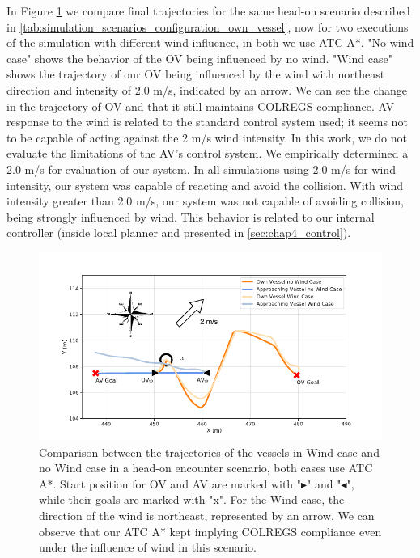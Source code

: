         In Figure \ref{fig:plot_ho_w_vs_wind} we compare final trajectories for the same head-on scenario described in \ref{tab:simulation_scenarios_configuration_own_vessel}, now for two executions of the simulation with different wind influence, in both we use \ac{ATC} A*. "No wind case" shows the behavior of the \ac{OV} being influenced by no wind. "Wind case" shows the trajectory of our \ac{OV} being influenced by the wind with northeast direction and intensity of 2.0 m/s, indicated by an arrow. We can see the change in the trajectory of \ac{OV} and that it still maintains \ac{COLREGS}-compliance. \ac{AV} response to the wind is related to the standard control system used; it seems not to be capable of acting against the 2 m/s wind intensity. In this work, we do not evaluate the limitations of the \ac{AV}'s control system. We empirically determined a 2.0 m/s for evaluation of our system. In all simulations using 2.0 m/s for wind intensity, our system was capable of reacting and avoid the collision. With wind intensity greater than 2.0 m/s, our system was not capable of avoiding collision, being strongly influenced by wind. This behavior is related to our internal controller (inside local planner and presented in \ref{sec:chap4_control}). 
        
        \begin{figure}[H]
            \centering
            \includegraphics[width=\textwidth]{figs/Chap5/plot_ho_w_vs_wind.pdf}
            \caption{Comparison between the trajectories of the vessels in Wind case and no Wind case in a head-on encounter scenario, both cases use \ac{ATC} A*. Start position for \ac{OV} and \ac{AV} are marked with "$\blacktriangleright$" and "$\blacktriangleleft$", while their goals are marked with "x". For the Wind case, the direction of the wind is northeast, represented by an arrow. We can observe that our \ac{ATC} A* kept implying COLREGS compliance even under the influence of wind in this scenario.}
            \label{fig:plot_ho_w_vs_wind}
        \end{figure}
        
